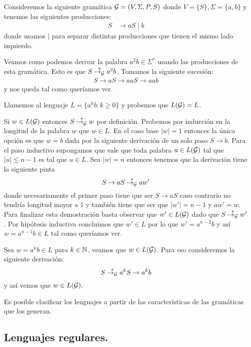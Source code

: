 \documentclass[tesis.tex]{subfiles}
\begin{document}
\medskip
\begin{ej}\label{gramatica-regular}
	Consideremos la siguiente gramática ${\cal G} = (V, \Sigma, P, S)$ donde $V = \{ S \}, \Sigma = \{ a,b \}$ y tenemos las siguientes producciones:
	\begin{align*}
		S & \to aS \mid b
	\end{align*}
	donde usamos $\mid$ para separar distintas producciones que tienen el mismo lado izquierdo.
	
	Veamos como podemos derivar la palabra $a^2b \in \Sigma^*$ usando las producciones de esta gramática. 
	Esto es que $S \overset{*}{\to_{\cal G}} a^2b$.
	Tomamos la siguiente sucesión:
	\begin{align*}
		S \to aS \to aaS \to aab
	\end{align*} 
	y nos queda tal como queríamos ver.
	
	Llamemos al lenguaje $L = \{ a^{k}b : k \ge 0 \}$ y probemos que $L({\cal G}) = L$. 
	
	Si $w \in L(\cal G)$ entonces $S \overset{*}{\to_{\cal G}} w$ por definición. 
	Probemos por inducción en la longitud de la palabra $w$ que $w \in L$.
	En el caso base $|w| = 1$ entonces la única opción es que $w = b$ dada por la siguiente derivación de un solo paso $S \to b$.
	Para el paso inductivo supongamos que vale que toda palabra $u \in L({\cal G})$ tal que $|u| \le n-1$ es tal que $u \in L$.
	Sea $|w| = n$ entonces tenemos que la derivación tiene la siguiente pinta
	\[
		S \to aS \overset{*}{\to_{\cal G}} aw'
	\]
	donde necesariamente el primer paso tiene que ser $S \to aS$ caso contrario no tendría longitud mayor a $1$ y también tiene que ser que $|w'| = n-1$ y $aw' = w$.
	Para finalizar esta demostración basta observar que $w' \in L({\cal G})$ dado que $S \overset{*}{\to_{\cal G}} w'$.
	Por hipótesis inductiva concluimos que $w' \in L$ por lo que $w' = a^{n-2}b$ y así $w = a^{n-1}b \in L$ tal como queríamos ver.
	
	Sea $w = a^kb \in L$ para $k \in \mathbb{N}$, veamos que $w \in L({\cal G})$.
	Para eso consideremos la siguiente derivación:
	\[
		S \overset{*}{\to_{\cal G}} a^k S \to a^k b
	\]
	y así vemos que $w \in L({\cal G})$.
\end{ej}



Es posible clasificar los lenguajes a partir de las características de las gramáticas que los generan. 

\subsection{Lenguajes regulares.}
\end{document}
